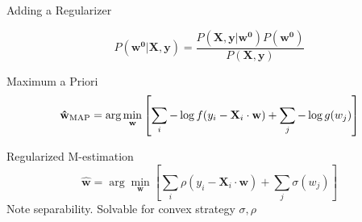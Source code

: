 \documentclass[pdf]{beamer}
\begin{document}
\begin{frame}[t]{Adding a Regularizer}

    \begin{equation*}
        P(\mathbf{w^0}|\mathbf{X},\mathbf{y}) = \frac{P(\mathbf{X},\mathbf{y}|\mathbf{w^0})P(\mathbf{w^0})}{P(\mathbf{X},\mathbf{y})}
    \end{equation*}

    \begin{block}{Maximum a Priori}
        \begin{equation*}
            \small{\mathbf{\hat{w}_{\text{MAP}}} =\arg\min_{\mathbf{w}}{\left[\sum_i{-\log f(y_i - \mathbf{X}_i\cdot \mathbf{w})} +\sum_j{-\log{g(w_j)}}\right]}}
        \end{equation*}
    \end{block}

    \begin{block}{Regularized M-estimation}
    \begin{equation*}
        \mathbf{\hat{w}}=\arg \min_{\mathbf{w}}{\left[ \sum_{i} {\rho\left( y_i - \mathbf{X}_{i} \cdot \mathbf{w}\right)} + \sum_j{\sigma(w_j)}\right]}
    \end{equation*}
    Note separability. Solvable for convex strategy $\sigma,\rho$
    \end{block}

\end{frame}
\end{document}
